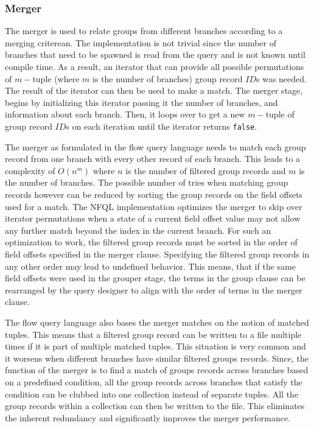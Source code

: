 \subsubsection{Merger}

The merger is used to relate groups from different branches according to a
merging criterean. The implementation is not trivial since the number of
branches that need to be spawned is read from the query and is not known until
compile time. As a result, an iterator that can provide all possible
permutations of $m-$tuple (where $m$ is the number of branches) group record
$ID$s was needed.  The result of the iterator can then be used to make a
match. The merger stage, begins by initializing this iterator passing it the
number of branches, and information about each branch. Then, it loops over to
get a new $m-$tuple of group record $ID$s on each iteration until the iterator
returns \texttt{false}.

The merger as formulated in the flow query language needs to match each group
record from one branch with every other record of each branch. This leads to a
complexity of $O(n^m)$ where $n$ is the number of filtered group records and
$m$ is the number of branches. The possible number of tries when matching
group records however can be reduced by sorting the group records on the field
offsets used for a match. The \ac{NFQL} implementation optimizes the merger to
skip over iterator permutations when a state of a current field offset value
may not allow any further match beyond the index in the current branch.  For
such an optimization to work, the filtered group records must be sorted in the
order of field offsets specified in the merger clause. Specifying the filtered
group records in any other order may lead to undefined behavior. This means,
that if the same field offsets were used in the grouper stage, the terms in
the group clause can be rearranged by the query designer to align with the
order of terms in the merger clause.

The flow query language also bases the merger matches on the notion of matched
tuples. This means that a filtered group record can be written to a file
multiple times if it is part of multiple matched tuples. This situation is
very common and it worsens when different branches have similar filtered
groups records. Since, the function of the merger is to find a match of groups
records across branches based on a predefined condition, all the group records
across branches that satisfy the condition can be clubbed into one collection
instead of separate tuples. All the group records within a collection can then
be written to the file. This eliminates the inherent redundancy and
significantly improves the merger performance.

